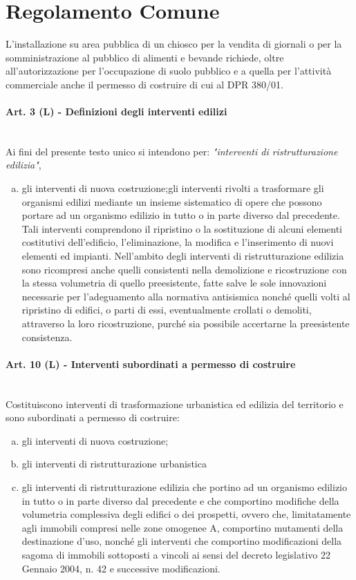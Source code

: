 \section{Regolamento Comune}

L’installazione su area pubblica di un chiosco per la vendita di giornali o per la somministrazione al pubblico di alimenti e bevande richiede, oltre all’autorizzazione per l’occupazione di suolo pubblico e a quella per l’attività commerciale anche il permesso di costruire di cui al DPR 380/01.


\paragraph{Art. 3 (L) - Definizioni degli interventi edilizi} ~\\
\noindent
Ai fini del presente testo unico si intendono per: \textit{"interventi di ristrutturazione edilizia"}, 

\begin{enumerate}[a)]
	\item gli interventi di nuova costruzione;gli interventi rivolti a trasformare gli organismi edilizi mediante un insieme sistematico di opere che possono portare ad un organismo edilizio in tutto o in parte diverso dal precedente. Tali interventi comprendono il ripristino o la sostituzione di alcuni elementi costitutivi dell'edificio, l’eliminazione, la modifica e l'inserimento di nuovi elementi ed impianti. Nell'ambito degli interventi di ristrutturazione edilizia sono ricompresi anche quelli consistenti nella demolizione e ricostruzione con la stessa volumetria di quello preesistente, fatte salve le sole innovazioni necessarie per l'adeguamento alla normativa antisismica nonché quelli volti al ripristino di edifici, o parti di essi, eventualmente crollati o demoliti, attraverso la loro ricostruzione, purché sia possibile accertarne la preesistente consistenza. 
\end{enumerate}
\paragraph{Art. 10 (L) - Interventi subordinati a permesso di costruire} ~ \\
\noindent
Costituiscono interventi di trasformazione urbanistica ed edilizia del territorio e sono subordinati a permesso di costruire:
\begin{enumerate}[a)]
	\item gli interventi di nuova costruzione;
	\item gli interventi di ristrutturazione urbanistica
	\item gli interventi di ristrutturazione edilizia che portino ad un organismo edilizio in tutto o in parte diverso dal precedente e che comportino modifiche della volumetria complessiva degli edifici o dei prospetti, ovvero che, limitatamente agli immobili compresi nelle zone omogenee A, comportino mutamenti della destinazione d’uso, nonché gli interventi che comportino modificazioni della sagoma di immobili sottoposti a vincoli ai sensi del decreto legislativo 22 Gennaio 2004, n. 42 e successive modificazioni.
\end{enumerate}